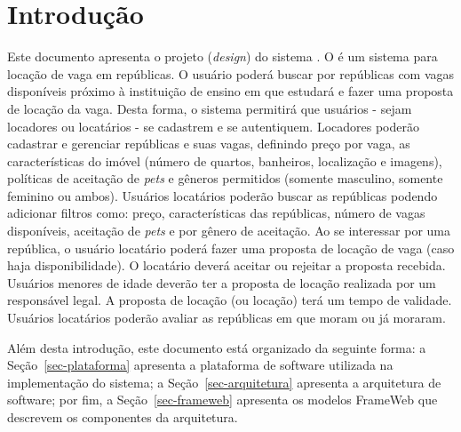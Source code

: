 \chapter{Introdução}
\label{sec-intro}
\vspace{-1cm}

Este documento apresenta o projeto (\textit{design}) do sistema \emph{\imprimirtitulo}. O \emph{\imprimirtitulo} é um sistema para locação de vaga em repúblicas. O usuário poderá buscar por repúblicas com vagas disponíveis próximo à instituição de ensino em que estudará e fazer uma proposta de locação da vaga. Desta forma, o sistema permitirá que usuários - sejam locadores ou locatários - se cadastrem e se autentiquem. Locadores poderão cadastrar e gerenciar repúblicas e suas vagas, definindo preço por vaga, as características do imóvel (número de quartos, banheiros, localização e imagens), políticas de aceitação de \textit{pets} e gêneros permitidos (somente masculino, somente feminino ou ambos). Usuários locatários poderão buscar as repúblicas podendo adicionar filtros como: preço, características das repúblicas, número de vagas disponíveis, aceitação de \textit{pets} e por gênero de aceitação. Ao se interessar por uma república, o usuário locatário poderá fazer uma proposta de locação de vaga (caso haja disponibilidade). O locatário deverá aceitar ou rejeitar a proposta recebida. Usuários menores de idade deverão ter a proposta de locação realizada por um responsável legal. 
A proposta de locação (ou locação) terá um tempo de validade. Usuários locatários poderão avaliar as repúblicas em que moram ou já moraram.

Além desta introdução, este documento está organizado da seguinte forma: 
a Seção~\ref{sec-plataforma} apresenta a plataforma de software utilizada na implementação do sistema;
a Seção~\ref{sec-arquitetura} apresenta a arquitetura de software; por fim, 
a Seção~\ref{sec-frameweb} apresenta os modelos FrameWeb que descrevem os componentes da arquitetura.


